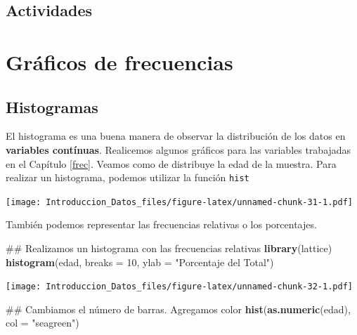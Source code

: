 \documentclass[spanish,]{book}
\newenvironment{Shaded}{\begin{snugshade}}{\end{snugshade}}
\newcommand{\KeywordTok}[1]{\textcolor[rgb]{0.13,0.29,0.53}{\textbf{#1}}}
\newcommand{\DataTypeTok}[1]{\textcolor[rgb]{0.13,0.29,0.53}{#1}}
\newcommand{\DecValTok}[1]{\textcolor[rgb]{0.00,0.00,0.81}{#1}}
\newcommand{\StringTok}[1]{\textcolor[rgb]{0.31,0.60,0.02}{#1}}
\newcommand{\OperatorTok}[1]{\textcolor[rgb]{0.81,0.36,0.00}{\textbf{#1}}}
\newcommand{\NormalTok}[1]{#1}
\begin{document}
\section{Actividades}\label{actividades}

\chapter{Gráficos de frecuencias}\label{graficos-de-frecuencias}

\section{Histogramas}\label{histogramas}

El histograma es una buena manera de observar la distribución de los
datos en \textbf{variables contínuas}. Realicemos algunos gráficos para
las variables trabajadas en el Capítulo \ref{frec}. Veamos como de
distribuye la edad de la muestra. Para realizar un histograma, podemos
utilizar la función \texttt{hist}

\begin{Shaded}
\end{Shaded}

\texttt{[image: Introduccion\_Datos\_files/figure-latex/unnamed-chunk-31-1.pdf]}

También podemos representar las frecuencias relativas o los porcentajes.

\begin{Shaded}
\begin{Highlighting}[]
\NormalTok{## Realizamos un histograma con las frecuencias relativas}
\KeywordTok{library}\NormalTok{(lattice)}
\KeywordTok{histogram}\NormalTok{(edad,}
          \DataTypeTok{breaks =} \DecValTok{10}\NormalTok{,}
          \DataTypeTok{ylab =} \StringTok{"Porcentaje del Total"}\NormalTok{)}
\end{Highlighting}
\end{Shaded}

\texttt{[image: Introduccion\_Datos\_files/figure-latex/unnamed-chunk-32-1.pdf]}

\begin{Shaded}
\begin{Highlighting}[]
\NormalTok{## Cambiamos el número de barras. Agregamos color}
\KeywordTok{hist}\NormalTok{(}\KeywordTok{as.numeric}\NormalTok{(edad),}
     \DataTypeTok{col =} \StringTok{"seagreen"}\NormalTok{)}
\end{Highlighting}
\end{Shaded}
\end{document}
